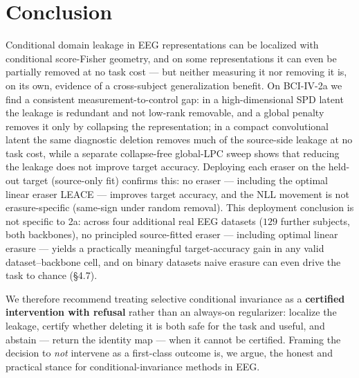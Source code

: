 \section{Conclusion}

Conditional domain leakage in EEG representations can be localized with conditional score-Fisher geometry, and on some representations it can even be partially removed at no task cost --- but neither measuring it nor removing it is, on its own, evidence of a cross-subject generalization benefit. On BCI-IV-2a we find a consistent measurement-to-control gap: in a high-dimensional SPD latent the leakage is redundant and not low-rank removable, and a global penalty removes it only by collapsing the representation; in a compact convolutional latent the same diagnostic deletion removes much of the source-side leakage at no task cost, while a separate collapse-free global-LPC sweep shows that reducing the leakage does not improve target accuracy. Deploying each eraser on the held-out target (source-only fit) confirms this: no eraser --- including the optimal linear eraser LEACE --- improves target accuracy, and the NLL movement is not erasure-specific (same-sign under random removal). This deployment conclusion is not specific to 2a: across four additional real EEG datasets ($129$ further subjects, both backbones), no principled source-fitted eraser --- including optimal linear erasure --- yields a practically meaningful target-accuracy gain in any valid dataset--backbone cell, and on binary datasets naive erasure can even drive the task to chance (\S4.7).

We therefore recommend treating selective conditional invariance as a \textbf{certified intervention with refusal} rather than an always-on regularizer: localize the leakage, certify whether deleting it is both safe for the task and useful, and abstain --- return the identity map --- when it cannot be certified. Framing the decision to \emph{not} intervene as a first-class outcome is, we argue, the honest and practical stance for conditional-invariance methods in EEG.
